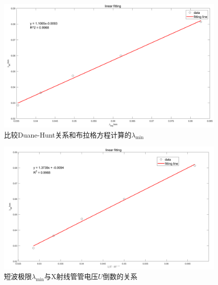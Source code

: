 \documentclass{whureport}
\begin{document}
	\begin{figure}[H]
		\centering
		\includegraphics[width = \textwidth]{dh_brg.png}
		\captionsetup{font=footnotesize}
		\caption{比较Duane-Hunt关系和布拉格方程计算的$\lambda_{\min}$}
		\label{fig:dh_brg}
	\end{figure}
	\begin{figure}[H]
		\centering
		\includegraphics[width = \textwidth]{lu.png}
		\captionsetup{font=footnotesize}
		\caption{短波极限$\lambda_{\min}$与X射线管管电压$U$倒数的关系}
		\label{fig:lu}
	\end{figure}
\end{document}
